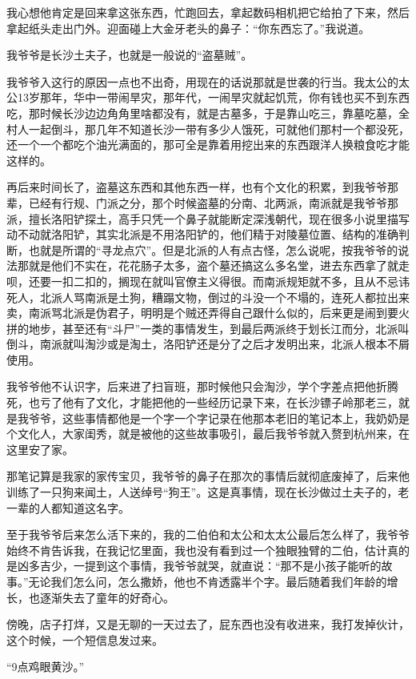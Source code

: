 我心想他肯定是回来拿这张东西，忙跑回去，拿起数码相机把它给拍了下来，然后拿起纸头走出门外。迎面碰上大金牙老头的鼻子：“你东西忘了。”我说道。

我爷爷是长沙土夫子，也就是一般说的“盗墓贼”。

我爷爷入这行的原因一点也不出奇，用现在的话说那就是世袭的行当。我太公的太公13岁那年，华中一带闹旱灾，那年代，一闹旱灾就起饥荒，你有钱也买不到东西吃，那时候长沙边边角角里啥都没有，就是古墓多，于是靠山吃三，靠墓吃墓，全村人一起倒斗，那几年不知道长沙一带有多少人饿死，可就他们那村一个都没死，还一个一个都吃个油光满面的，那可全是靠着用挖出来的东西跟洋人换粮食吃才能这样的。

再后来时间长了，盗墓这东西和其他东西一样，也有个文化的积累，到我爷爷那辈，已经有行规、门派之分，那个时候盗墓的分南、北两派，南派就是我爷爷那派，擅长洛阳铲探土，高手只凭一个鼻子就能断定深浅朝代，现在很多小说里描写动不动就洛阳铲，其实北派是不用洛阳铲的，他们精于对陵墓位置、结构的准确判断，也就是所谓的“寻龙点穴”。但是北派的人有点古怪，怎么说呢，按我爷爷的说法那就是他们不实在，花花肠子太多，盗个墓还搞这么多名堂，进去东西拿了就走呗，还要一扣二扣的，搁现在就叫官僚主义得很。而南派规矩就不多，且从不忌讳死人，北派人骂南派是土狗，糟蹋文物，倒过的斗没一个不塌的，连死人都拉出来卖，南派骂北派是伪君子，明明是个贼还弄得自己跟什么似的，后来更是闹到要火拼的地步，甚至还有“斗尸”一类的事情发生，到最后两派终于划长江而分，北派叫倒斗，南派就叫淘沙或是淘土，洛阳铲还是分了之后才发明出来，北派人根本不屑使用。

我爷爷他不认识字，后来进了扫盲班，那时候他只会淘沙，学个字差点把他折腾死，也亏了他有了文化，才能把他的一些经历记录下来，在长沙镖子岭那老三，就是我爷爷，这些事情都他是一个字一个字记录在他那本老旧的笔记本上，我奶奶是个文化人，大家闺秀，就是被他的这些故事吸引，最后我爷爷就入赘到杭州来，在这里安了家。

那笔记算是我家的家传宝贝，我爷爷的鼻子在那次的事情后就彻底废掉了，后来他训练了一只狗来闻土，人送绰号“狗王”。这是真事情，现在长沙做过土夫子的，老一辈的人都知道这名字。

至于我爷爷后来怎么活下来的，我的二伯伯和太公和太太公最后怎么样了，我爷爷始终不肯告诉我，在我记忆里面，我也没有看到过一个独眼独臂的二伯，估计真的是凶多吉少，一提到这个事情，我爷爷就哭，就直说：“那不是小孩子能听的故事。”无论我们怎么问，怎么撒娇，他也不肯透露半个字。最后随着我们年龄的增长，也逐渐失去了童年的好奇心。

傍晚，店子打烊，又是无聊的一天过去了，屁东西也没有收进来，我打发掉伙计，这个时候，一个短信息发过来。

“9点鸡眼黄沙。”


